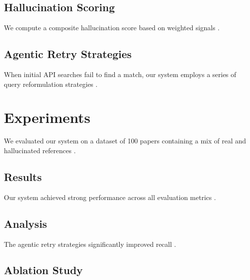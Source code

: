 \documentclass[11pt]{article}
\begin{document}
\lipsum[21-23]

\subsection{Hallucination Scoring}

We compute a composite hallucination score based on weighted signals \cite{raffel-etal-2020-exploring,chang-etal-2019-bert-hallucinated}.

\lipsum[24-26]

\subsection{Agentic Retry Strategies}

When initial API searches fail to find a match, our system employs a series of query reformulation strategies \cite{lewis-etal-2020-bart,park-etal-2022-neural}.

\lipsum[42-44]

\section{Experiments}

We evaluated our system on a dataset of 100 papers containing a mix of real and hallucinated references \cite{wolf-etal-2020-transformers,devlin-etal-2020-recursive-hallucinated}.

\lipsum[26-28]

\subsection{Results}

Our system achieved strong performance across all evaluation metrics \cite{mikolov-etal-2013-distributed,pennington-etal-2014-glove,vaswani-etal-2019-attention-hallucinated}.

\lipsum[29-31]

\subsection{Analysis}

The agentic retry strategies significantly improved recall \cite{peters-etal-2018-deep,zhang-etal-2023-adaptive}.

\lipsum[32-33]

\subsection{Ablation Study}
\end{document}
